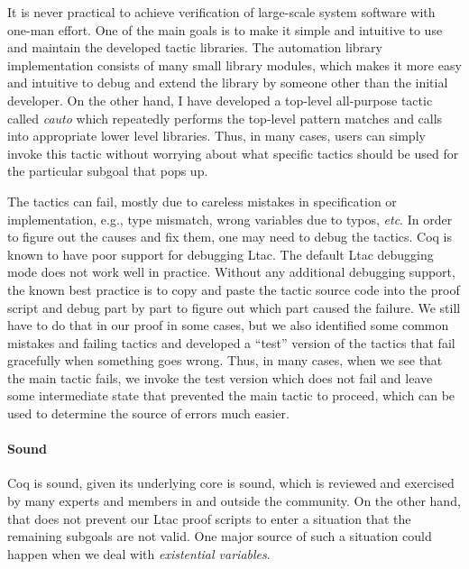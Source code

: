 It is never practical to achieve verification of large-scale system software
with one-man effort. One of the main goals is to make it simple and intuitive
to use and maintain the developed tactic libraries. 
The automation library implementation consists of many small library modules, which
makes it more easy and intuitive to debug and extend the library by someone
other than the initial developer. On the other hand, I have developed a top-level
all-purpose tactic called {\it cauto} which repeatedly performs the top-level
pattern matches and calls into appropriate lower level libraries.
Thus, in many cases, users can simply invoke this tactic without worrying about
what specific tactics should be used for the particular subgoal that pops up.

The tactics can fail, mostly due to careless mistakes in specification or implementation,
e.g., type mismatch, wrong variables due to typos, {\it etc}. In order to figure
out the causes and fix them, one may need to debug the tactics. Coq is known to
have poor support for debugging Ltac. The default Ltac debugging mode does not
work well in practice. Without any additional debugging support, the known best
practice is to copy and paste the tactic source code into the proof script
and debug part by part to figure out which part caused the failure.
We still have to do that in our proof in some cases, but we also identified
some common mistakes and failing tactics and developed a ``test'' version of
the tactics that fail gracefully when
something goes wrong. Thus, in many cases, when we see that the main tactic
fails, we invoke the test version which does not fail and leave some intermediate
state that prevented the main tactic to proceed, which can be used to determine
the source of errors much easier.


\paragraph{Sound}
Coq is sound, given its underlying core is sound, which is reviewed and exercised
by many experts and members in and outside the community. On the other hand,
that does not prevent our Ltac proof scripts to enter a situation that the remaining
subgoals are not valid. One major source of such a situation could happen when we
deal with {\it existential variables}. 

